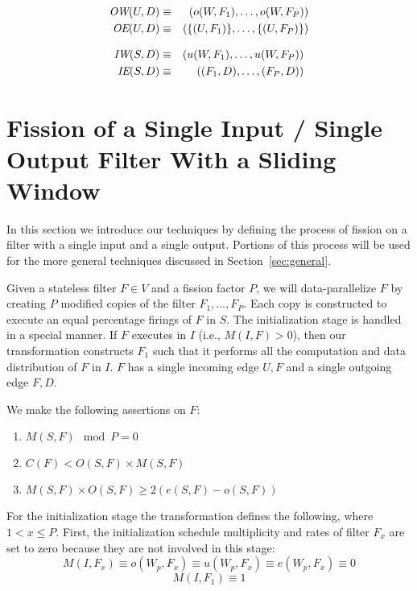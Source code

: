 \begin{eqnarray*} 
\mbox{\it OW}(U,D) & \equiv & (o(W,F_1),\ldots,o(W, F_P)) \\
\mbox{\it OE}(U,D) & \equiv & (\{(U,F_1)\},\dots,\{(U,F_P)\}) 
\end{eqnarray*}

\begin{eqnarray*} 
\mbox{\it IW}(S,D) & \equiv & (u(W,F_1),\ldots,u(W, F_P)) \\
\mbox{\it IE}(S,D) & \equiv & ((F_1, D),\dots,(F_P, D)) 
\end{eqnarray*}

\section{Fission of a Single Input / Single Output Filter With a
Sliding Window}
\label{sec:single}

In this section we introduce our techniques by defining the
process of fission on a filter with a single input and a single
output. Portions of this process will be used for the more general
techniques discussed in Section~\ref{sec:general}. 

Given a stateless filter $F \in V$ and a fission factor $P$, we will
data-parallelize $F$ by creating $P$ modified copies of the filter
$F_1, \ldots, F_P$.  Each copy is constructed to execute an equal
percentage firings of $F$ in $S$.  The initialization stage is handled
in a special manner.  If $F$ executes in $I$ (i.e., $M(I,F) > 0$),
then our transformation constructs $F_1$ such that it performs all the
computation and data distribution of $F$ in $I$. $F$ has a single
incoming edge ${U,F}$ and a single outgoing edge ${F, D}$.


We make the following assertions on $F$:

\begin{enumerate}

\item $M(S,F) \mod  P = 0$

\item $C(F) < O(S,F) \times M(S,F)$

\item $M(S,F) \times O(S,F) \ge 2(e(S,F) - o(S,F))$

\end{enumerate}


For the initialization stage the transformation defines the following,
where $1 < x \le P$. First, the initialization
schedule multiplicity and rates of filter $F_x$ are set to zero
because they are not involved in this stage:
$$ M(I,F_x) \equiv o(W_p,F_x) \equiv u(W_p,F_x) \equiv e(W_p,F_x)
\equiv 0 $$
$$ M(I,F_1) \equiv 1 $$

